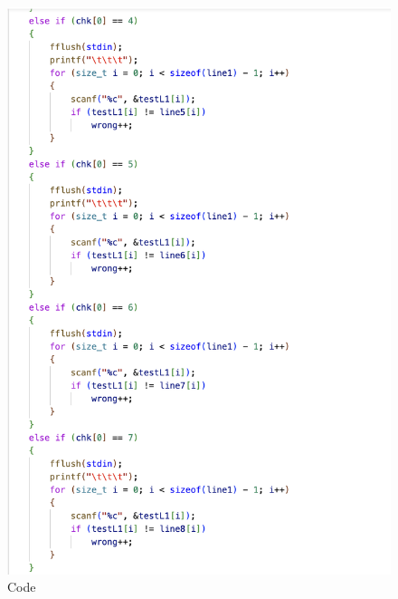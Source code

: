 \begin{figure}[h]
     \includegraphics[scale=0.16]{CodeScreenShot/6b.png}
    \caption{Code}
    \label{fig:code-screenshots}
\end{figure}
